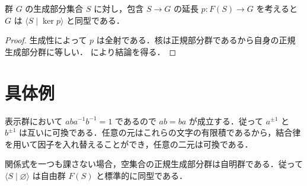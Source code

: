 \begin{prop}[任意の群の表示]
群 $G$ の生成部分集合 $S$ に対し，包含 $S\to G$ の延長 $p:F(S)\to G$ を考えると $G$ は $\langle S\mid\ker p\rangle$ と同型である．
\end{prop}
\begin{proof}
生成性によって $p$ は全射である．核は正規部分群であるから自身の正規生成部分群に等しい． により結論を得る．
\end{proof}
\section{具体例}
\begin{prop}[二元の可換性を課す表示]
表示群において $aba^{-1}b^{-1}=1$ であるので $ab=ba$ が成立する．従って $a^{\pm1}$ と $b^{\pm1}$ は互いに可換である．任意の元はこれらの文字の有限積であるから，結合律を用いて因子を入れ替えることができ，任意の二元は可換である．
\end{prop}
\begin{prop}[関係式のない表示]
関係式を一つも課さない場合，空集合の正規生成部分群は自明群である．従って $\langle S\mid\varnothing\rangle$ は自由群 $F(S)$ と標準的に同型である．
\end{prop}
